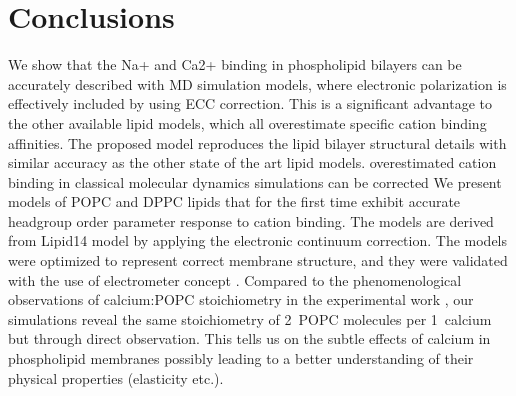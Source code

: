 \documentclass[aip,jcp,twocolumn]{revtex4}
\begin{document}



\section{Conclusions}
We show that the Na+ and Ca2+ binding in phospholipid bilayers can
be accurately described with MD simulation models, where electronic
polarization is effectively included by using ECC correction.
This is a significant advantage to the other available lipid models,
which all overestimate specific cation binding affinities.  
The proposed model reproduces the lipid bilayer structural details
with similar accuracy as the other state of the art lipid models.
overestimated cation binding in classical molecular
dynamics simulations can be corrected 
We present models of POPC and DPPC lipids that for the first time exhibit accurate headgroup order parameter response to cation binding. 
The models are derived from Lipid14 model \cite{dickson14} by applying the electronic continuum correction. 
The models were optimized to represent correct membrane structure, 
and they were validated with the use of electrometer concept \cite{seelig87,Altenbach85,Altenbach84}. 
Compared to the phenomenological observations of calcium:POPC stoichiometry in the experimental work \cite{Altenbach84}, 
our simulations reveal the same stoichiometry of 2~POPC molecules per 1~calcium but through direct observation. 
This tells us on the subtle effects of calcium in phospholipid membranes 
possibly leading to a better understanding of their physical properties (elasticity etc.). 
\end{document}
